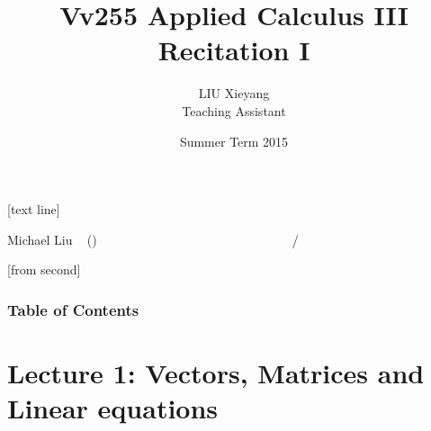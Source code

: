 \documentclass{beamer}
\begin{document}



[text line]{%
	\color{blue!40!black}\parbox{\linewidth}{\vspace*{-8pt}Michael Liu ~ (\insertshortinstitute)~~~~~~~~~~~~~~~~~~~~~~~~\insertshorttitle\hfill\insertshortdate~~~~~~\insertframenumber{}~/~\inserttotalframenumber}}


[from second] 

\newcommand{\tabincell}[2]{\begin{tabular}{@{}#1@{}}#2\end{tabular}}


\title[Vv255 Applied Calculus III]{Vv255 Applied Calculus III\\{\small Recitation I}}   
\author[Michael Liu]{LIU Xieyang\\{\tiny Teaching Assistant}} 
\date[Summer 2015]{Summer Term 2015} 
\begin{frame}
	\titlepage
\end{frame}

\begin{frame}
	\frametitle{Table of Contents}
	\tableofcontents
\end{frame}





\section{Lecture 1: Vectors, Matrices and Linear equations} 
\end{document}
